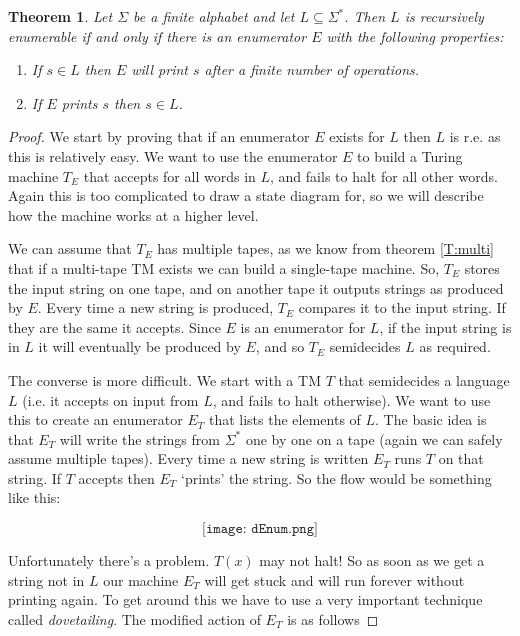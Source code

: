 \documentclass{article}
\theoremstyle{plain}
\newtheorem{theorem}{Theorem}[section]{\bfseries}{\itshape}
\theoremstyle{definition}
\begin{document}
\begin{theorem}\label{T:enum}
Let $\Sigma$ be a finite alphabet and let $L\subseteq\Sigma^*$. Then $L$ is recursively enumerable if and only if there is an enumerator $E$ with the following properties:
\begin{enumerate}
\item If $s\in L$ then $E$ will print $s$ after a finite number of operations.
\item If $E$ prints $s$ then $s\in L$.
\end{enumerate}
\end{theorem}
\begin{proof}
We start by proving that if an enumerator $E$ exists for $L$ then $L$ is r.e. as this is relatively easy. We want to use the enumerator $E$ to build a Turing machine $T_E$ that accepts for all words in $L$, and fails to halt for all other words. Again this is too complicated to draw a state diagram for, so we will describe how the machine works at a higher level. 

We can assume that $T_E$ has multiple tapes, as we know from theorem \ref{T:multi} that if a multi-tape TM exists we can build a single-tape machine. So, $T_E$ stores the input string on one tape, and on another tape it outputs strings as produced by $E$. Every time a new string is produced, $T_E$ compares it to the input string. If they are the same it accepts. Since $E$ is an enumerator for $L$, if the input string is in $L$ it will eventually be produced by $E$, and so $T_E$ semidecides $L$ as required.

The converse is more difficult. We start with a TM $T$ that semidecides a language $L$ (i.e. it accepts on input from $L$, and fails to halt otherwise). We want to use this to create an enumerator $E_T$ that lists the elements of $L$. The basic idea is that $E_T$ will write the strings from $\Sigma^*$ one by one on a tape (again we can safely assume multiple tapes). Every time a new string is written $E_T$ runs $T$ on that string. If $T$ accepts then $E_T$ `prints' the string. So the flow would be something like this:

\[\texttt{[image: dEnum.png]} \]  

Unfortunately there's a problem. $T(x)$ may not halt! So as soon as we get a string not in $L$ our machine $E_T$ will get stuck and will run forever without printing again. To get around this we have to use a very important technique called \emph{dovetailing}. The modified action of $E_T$ is as follows


\end{proof}
\end{document}
